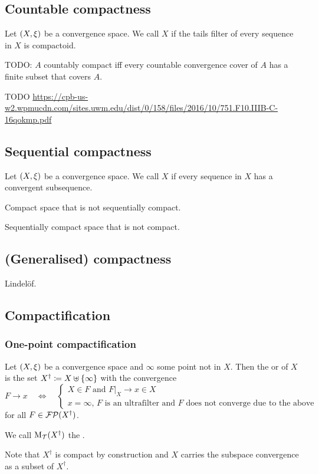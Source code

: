 \subsection{Countable compactness}
\begin{definition}
Let $\sSet{X,\xi}$ be a convergence space. We call $X$  if the tails filter of every sequence in $X$ is compactoid.
\end{definition}

\begin{proposition}
TODO: $A$ countably compact iff every countable convergence cover of $A$ has a finite subset that covers $A$.
\end{proposition}

TODO \url{https://cpb-us-w2.wpmucdn.com/sites.uwm.edu/dist/0/158/files/2016/10/751.F10.IIIB-C-16qokmp.pdf}

\subsection{Sequential compactness}
\begin{definition}
Let $\sSet{X,\xi}$ be a convergence space. We call $X$  if every sequence in $X$ has a convergent subsequence.
\end{definition}

\begin{example}
Compact space that is not sequentially compact.

Sequentially compact space that is not compact.
\end{example}



\subsection{(Generalised) compactness}
Lindelöf.

\subsection{Compactification}
\subsubsection{One-point compactification}
\begin{definition}
Let $\sSet{X,\xi}$ be a convergence space and $\infty$ some point not in $X$. Then the  or  of $X$ is the set $X^\dagger \coloneqq X\uplus \{\infty\}$ with the convergence
\[ F\to x \quad\iff\quad \begin{cases}
\text{$X\in F$ and $F|_X \to x\in X$} \\
\text{$x=\infty$, $F$ is an ultrafilter and $F$ does not converge due to the above}
\end{cases} \]
for all $F\in\operatorname{\mathcal{FP}}(X^\dagger)$.

We call $\operatorname{M_\mathcal{T}}(X^\dagger)$ the .
\end{definition}
Note that $X^\dagger$ is compact by construction and $X$ carries the subspace convergence as a subset of $X^\dagger$.

